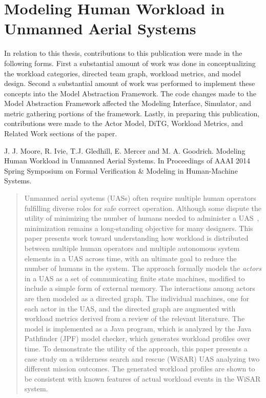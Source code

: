 \chapter{Modeling Human Workload in Unmanned Aerial Systems}\label{ch:workload_paper}

In relation to this thesis, contributions to this publication were made in the following forms.  First a substantial amount of work was done in conceptualizing the workload categories, directed team graph, workload metrics, and model design.  Second a substantial amount of work was performed to implement these concepts into the Model Abstraction Framework.  The code changes made to the Model Abstraction Framework affected the Modeling Interface, Simulator, and metric gathering portions of the framework.  Lastly, in preparing this publication, contributions were made to the Actor Model, DiTG, Workload Metrics, and Related Work sections of the paper.
\linebreak

\noindent J. J. Moore, R. Ivie, T.J. Gledhill, E. Mercer and M. A. Goodrich. Modeling Human Workload in Unmanned Aerial Systems. In Proceedings of AAAI 2014 Spring Symposium on Formal Verification \& Modeling in Human-Machine Systems.

\begin{abstract}
Unmanned aerial systems (UASs) often require multiple human operators fulfilling diverse roles for safe correct operation.  Although some dispute the utility of minimizing the number of humans needed to administer a UAS~\cite{MurphyBurke2010}, minimization remains a long-standing objective for many designers.  This paper presents work toward understanding how workload is distributed between multiple human operators and multiple autonomous system elements in a UAS across time, with an ultimate goal to reduce the number of humans in the system. The approach formally models the {\em actors} in a UAS as a set of communicating finite state machines, modified to include a simple form of external memory. The interactions among actors are then modeled as a directed graph.  The individual machines, one for each actor in the UAS, and the directed graph are augmented with workload metrics derived from a review of the relevant literature. The model is implemented as a Java program, which is analyzed by the Java Pathfinder (JPF) model checker, which generates workload profiles over time.  To demonstrate the utility of the approach, this paper presents a case study on a wilderness search and rescue (WiSAR) UAS analyzing two different mission outcomes. The generated workload profiles are shown to be consistent with known features of actual workload events in the WiSAR system. 
\end{abstract}

